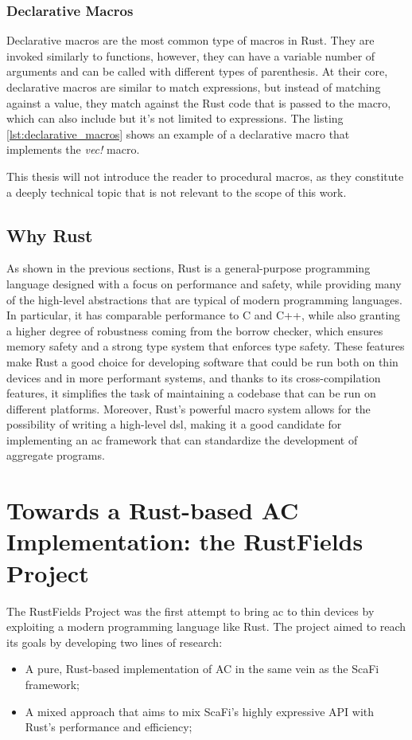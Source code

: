 \subsubsection{Declarative Macros}
Declarative macros are the most common type of macros in Rust. They are invoked similarly to functions, however, they can have a variable number of arguments and can be called with different types of parenthesis.
At their core, declarative macros are similar to match expressions, but instead of matching against a value, they match against the Rust code that is passed to the macro, which can also include but it's not limited to expressions.
The listing \ref{lst:declarative_macros} shows an example of a declarative macro that implements the \textit{vec!} macro.



This thesis will not introduce the reader to procedural macros, as they constitute a deeply technical topic that is not relevant to the scope of this work.

\subsection{Why Rust}
As shown in the previous sections, Rust is a general-purpose programming language designed with a focus on performance and safety, while providing many of the high-level abstractions that are typical of modern programming languages.
In particular, it has comparable performance to C and C++, while also granting a higher degree of robustness coming from the borrow checker, which ensures memory safety and a strong type system that
enforces type safety. These features make Rust a good choice for developing software that could be run both on thin devices and in more performant systems, and thanks to its cross-compilation features, it simplifies the task of maintaining
a codebase that can be run on different platforms. Moreover, Rust's powerful macro system allows for the possibility of writing a high-level \ac{dsl}, making it a good candidate for implementing an \ac{ac} framework that can standardize the development
of aggregate programs.

\section{Towards a Rust-based AC Implementation: the RustFields Project}
The RustFields Project\cite{001} was the first attempt to bring \ac{ac} to thin devices by exploiting a modern programming language like Rust. The project aimed to reach its goals by developing two lines of research:
\begin{itemize}
    \item A pure, Rust-based implementation of AC in the same vein as the ScaFi framework;
    \item A mixed approach that aims to mix ScaFi's highly expressive API with Rust's performance and efficiency;
\end{itemize}

